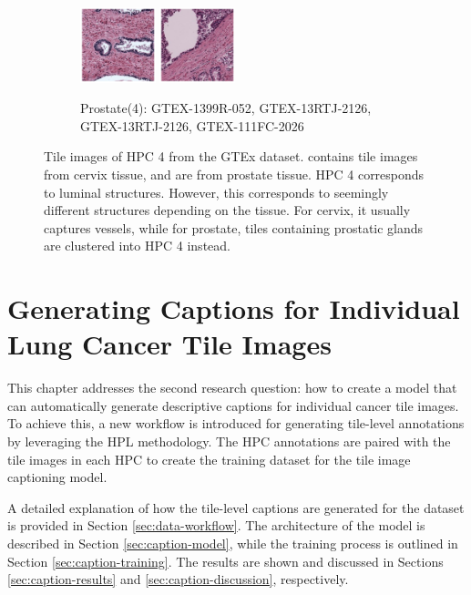 \documentclass{l4proj}
\begin{document}
\begin{figure}[h]
\begin{subfigure}[b]{\textwidth}
        \includegraphics[width=0.24\textwidth]{images/prostate4_3.png}
        \includegraphics[width=0.24\textwidth]{images/prostate4_4.png}
        \caption{Prostate(4): GTEX-1399R-052, GTEX-13RTJ-2126, GTEX-13RTJ-2126, GTEX-111FC-2026}
        \label{fig:prostate4}
    \end{subfigure}
    \caption{Tile images of HPC 4 from the GTEx dataset.  contains tile images from cervix tissue, and  are from prostate tissue. HPC 4 corresponds to luminal structures. However, this corresponds to seemingly different structures depending on the tissue. For cervix, it usually captures vessels, while for prostate, tiles containing prostatic glands are clustered into HPC 4 instead.
    }\label{fig:hpc4}
\end{figure}

\chapter{Generating Captions for Individual Lung Cancer Tile Images} \label{sec:caption}

This chapter addresses the second research question: how to create a model that can automatically generate descriptive captions for individual cancer tile images. To achieve this, a new workflow is introduced for generating tile-level annotations by leveraging the HPL methodology. The HPC annotations are paired with the tile images in each HPC to create the training dataset for the tile image captioning model.

A detailed explanation of how the tile-level captions are generated for the dataset is provided in Section \ref{sec:data-workflow}. The architecture of the model is described in Section \ref{sec:caption-model}, while the training process is outlined in Section \ref{sec:caption-training}. The results are shown and discussed in Sections \ref{sec:caption-results} and \ref{sec:caption-discussion}, respectively.
\end{document}
